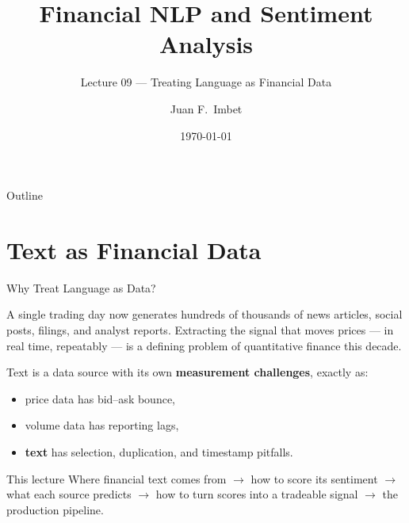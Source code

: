\documentclass[9pt,t]{beamer}
\title{Financial NLP and Sentiment Analysis}
\subtitle{Lecture 09 --- Treating Language as Financial Data}
\author{Juan F.\ Imbet}
\institute{Paris Dauphine -- PSL University}
\date{\today}
\begin{document}
\begin{frame}\titlepage\end{frame}

\begin{frame}{Outline}\tableofcontents\end{frame}

\section{Text as Financial Data}

\begin{frame}{Why Treat Language as Data?}
\begin{bigpicture}
A single trading day now generates hundreds of thousands of news articles,
social posts, filings, and analyst reports. Extracting the signal that moves
prices --- in real time, repeatably --- is a defining problem of quantitative
finance this decade.
\end{bigpicture}

\medskip
Text is a data source with its own \textbf{measurement challenges}, exactly as:
\begin{itemize}
  \item price data has bid--ask bounce,
  \item volume data has reporting lags,
  \item \textbf{text} has selection, duplication, and timestamp pitfalls.
\end{itemize}

\medskip
\begin{block}{This lecture}
Where financial text comes from $\to$ how to score its sentiment $\to$
what each source predicts $\to$ how to turn scores into a tradeable signal
$\to$ the production pipeline.
\end{block}
\end{frame}
\end{document}
